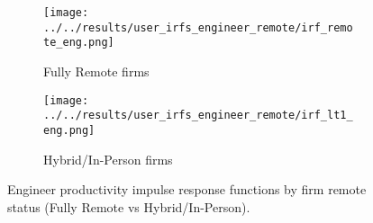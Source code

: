 \documentclass{article}
\begin{document}
\begin{figure}[htbp]
    \centering
    \begin{subfigure}{0.48\linewidth}
        \texttt{[image: ../../results/user\_irfs\_engineer\_remote/irf\_remote\_eng.png]}
        \caption{Fully Remote firms}
    \end{subfigure}\hfill
    \begin{subfigure}{0.48\linewidth}
        \texttt{[image: ../../results/user\_irfs\_engineer\_remote/irf\_lt1\_eng.png]}
        \caption{Hybrid/In-Person firms}
    \end{subfigure}
    \caption{Engineer productivity impulse response functions by firm remote status (Fully Remote vs Hybrid/In-Person).}
\end{figure}
\end{document}
